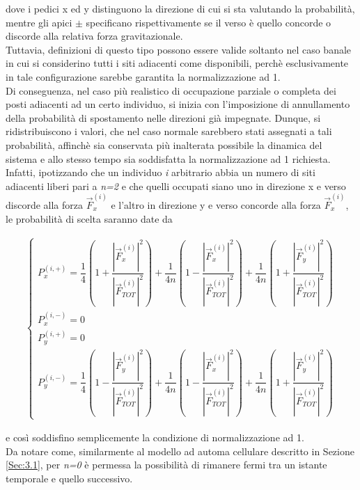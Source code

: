 \documentclass{article}
\begin{document}
dove i pedici x ed y distinguono la direzione di cui si sta valutando la probabilità, mentre gli apici $\pm$ specificano rispettivamente se il verso è quello concorde o discorde alla relativa forza gravitazionale.
\\ Tuttavia, definizioni di questo tipo possono essere valide soltanto nel caso banale in cui si considerino tutti i siti adiacenti come disponibili, perchè esclusivamente in tale configurazione sarebbe garantita la normalizzazione ad 1.
\\ Di conseguenza, nel caso più realistico di occupazione parziale o completa dei posti adiacenti ad un certo individuo, si inizia con l'imposizione di annullamento della probabilità di spostamento nelle direzioni già impegnate. Dunque, si ridistribuiscono i valori, che nel caso normale sarebbero stati assegnati a tali probabilità, affinchè sia conservata più inalterata possibile la dinamica del sistema e allo stesso tempo sia soddisfatta la normalizzazione ad 1 richiesta.
\\ Infatti, ipotizzando che un individuo \textit{i} arbitrario abbia un numero di siti adiacenti liberi pari a \textit{n=2} e che quelli occupati siano uno in direzione x e verso discorde alla forza $\vec{F}_x^{(i)}$ e l'altro in direzione y e verso concorde alla forza $\vec{F}_x^{(i)}$, le probabilità di scelta saranno date da

\begin{equation}
\begin{aligned}
\begin{cases}
P_x^{(i, +)} = \dfrac{1}{4} \left ( 1 + \dfrac{|\vec{F}_x^{(i)}|^2}{|\vec{F}_{TOT}^{(i)}|^2} \right ) + \dfrac{1}{4n} \left ( 1 - \dfrac{|\vec{F}_x^{(i)}|^2}{|\vec{F}_{TOT}^{(i)}|^2} \right ) + \dfrac{1}{4n} \left ( 1 + \dfrac{|\vec{F}_y^{(i)}|^2}{|\vec{F}_{TOT}^{(i)}|^2} \right ) \\
P_x^{(i, -)} = 0 \\
P_y^{(i, +)} = 0 \\
P_y^{(i, -)} = \dfrac{1}{4} \left ( 1 - \dfrac{|\vec{F}_y^{(i)}|^2}{|\vec{F}_{TOT}^{(i)}|^2} \right ) + \dfrac{1}{4n} \left ( 1 - \dfrac{|\vec{F}_x^{(i)}|^2}{|\vec{F}_{TOT}^{(i)}|^2} \right ) + \dfrac{1}{4n} \left ( 1 + \dfrac{|\vec{F}_y^{(i)}|^2}{|\vec{F}_{TOT}^{(i)}|^2} \right )
\end{cases}
\end{aligned}
\end{equation}

e così soddisfino semplicemente la condizione di normalizzazione ad 1.
\\ Da notare come, similarmente al modello ad automa cellulare descritto in Sezione \ref{Sec:3.1}, per \textit{n=0} è permessa la possibilità di rimanere fermi tra un istante temporale e quello successivo.
\end{document}

